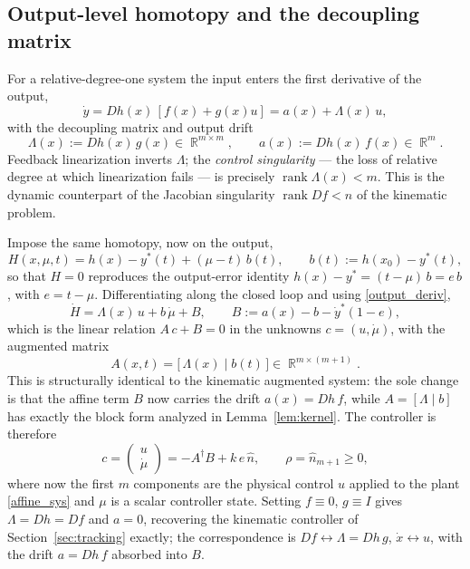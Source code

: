 \documentclass[11pt,american]{article}
\DeclareMathOperator{\R}{\mathbb{R}}
\DeclareMathOperator{\rank}{\operatorname{rank}}
\theoremstyle{definition}
\theoremstyle{plain}
\theoremstyle{remark}
\begin{document}
\subsection{Output-level homotopy and the decoupling matrix}

For a relative-degree-one system the input enters the first derivative of the output,
\begin{equation}\label{output_deriv}
\dot y = D h(x)\,[f(x)+g(x)u] = a(x) + \Lambda(x)\,u,
\end{equation}
with the decoupling matrix and output drift
\begin{equation}
\Lambda(x) := D h(x)\,g(x) \in \R^{m\times m}, \qquad a(x) := D h(x)\,f(x) \in \R^m .
\end{equation}
Feedback linearization inverts $\Lambda$; the \emph{control singularity} --- the loss of relative degree at which linearization fails --- is precisely $\rank \Lambda(x) < m$. This is the dynamic counterpart of the Jacobian singularity $\rank D f < n$ of the kinematic problem.

Impose the same homotopy, now on the output,
\begin{equation}\label{hom_dynamic}
H(x,\mu,t) = h(x) - y^*(t) + (\mu - t)\,b(t), \qquad b(t) := h(x_0) - y^*(t),
\end{equation}
so that $H = 0$ reproduces the output-error identity $h(x) - y^* = (t-\mu)\,b = e\,b$, with $e = t-\mu$. Differentiating along the closed loop and using \eqref{output_deriv},
\begin{equation}
\dot H = \Lambda(x)\,u + b\,\dot\mu + B, \qquad B := a(x) - b - \dot y^*(1-e),
\end{equation}
which is the linear relation $A\,c + B = 0$ in the unknowns $c = (u,\dot\mu)$, with the augmented matrix
\begin{equation}\label{A_dynamic}
A(x,t) = \bigl[\, \Lambda(x) \;\big|\; b(t) \,\bigr] \in \R^{m\times(m+1)} .
\end{equation}
This is structurally identical to the kinematic augmented system: the sole change is that the affine term $B$ now carries the drift $a(x) = D h\,f$, while $A = [\Lambda \mid b]$ has exactly the block form analyzed in Lemma~\ref{lem:kernel}. The controller is therefore
\begin{equation}\label{flow_dynamic}
c = \begin{pmatrix} u \\ \dot\mu \end{pmatrix} = -A^\dagger B + k\,e\,\hat n, \qquad \rho = \hat n_{m+1} \ge 0,
\end{equation}
where now the first $m$ components are the physical control $u$ applied to the plant \eqref{affine_sys} and $\mu$ is a scalar controller state. Setting $f \equiv 0$, $g \equiv I$ gives $\Lambda = D h = D f$ and $a = 0$, recovering the kinematic controller of Section~\ref{sec:tracking} exactly; the correspondence is $D f \leftrightarrow \Lambda = D h\,g$, $\dot x \leftrightarrow u$, with the drift $a = D h\,f$ absorbed into $B$.
\end{document}
